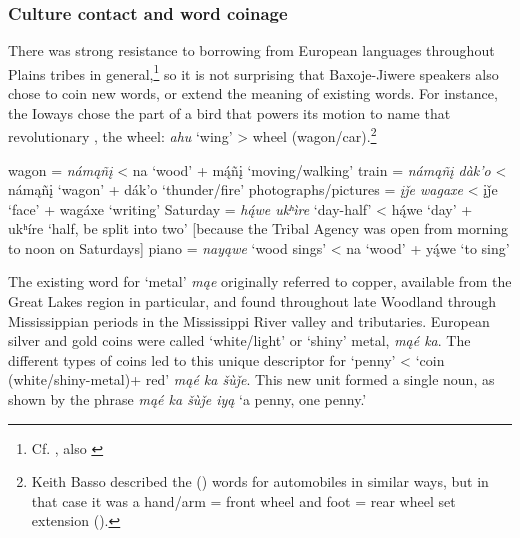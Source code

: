 \documentclass[output=paper]{LSP/langsci}
\begin{document}
\subsubsection{Culture contact and word coinage}
					   		     	     
There was strong resistance to borrowing from European languages throughout Plains tribes in general,\footnote{Cf. \citet{Brown1999}, also \citet{Larson2004}} so it is not surprising that Baxoje-Jiwere speakers also chose to coin new words, or extend the meaning of existing words. For instance, the Ioways chose the part of a bird that powers its motion to name that revolutionary , the wheel: \textit{ahu} `wing' > wheel (wagon/car).\footnote{Keith Basso described the  () words for automobiles in similar ways, but in that case it was a hand/arm = front wheel and foot = rear wheel set extension (\citeyear[17]{Basso1990}).}   

\begin{exe}
\ex
\begin{xlist}
\ex wagon = \textit{nám\k{a}ñ\k{i}} < na `wood' + m\k{á}ñ\k{i} `moving/walking'
\ex train = \textit{nám\k{a}ñ\k{i} dàk'o}  <  nám\k{a}ñ\k{i} `wagon' + dák'o `thunder/fire'		       	          	
\ex photographs/pictures = \textit{\k{i}\v{j}e wagaxe}  < \k{i}\v{j}e `face' + wagáxe `writing'	        	         	
\ex Saturday = \textit{h\k{á}we ukʰ\`ire} `day-half' < h\k{á}we `day' + ukʰ\'ire `half, be split into two' 	[because the Tribal Agency was open from morning to noon on Saturdays]        	    	
\ex piano = \textit{nay\k{a}we}  `wood sings' < na `wood' + y\k{á}we  `to sing'
\end{xlist}
\end{exe}

The existing word for `metal' \textit{m\k{a}e} originally referred to copper, available from the Great Lakes region in particular, and found throughout late Woodland through Mississippian periods in the Mississippi River valley and tributaries.  European silver and gold coins were called `white/light' or `shiny' metal, \textit{m\k{a}é ka}. The different types of coins led to this unique descriptor for `penny' < `coin (white/shiny-metal)+ red' \textit{m\k{a}é ka \v{s}\`u\v{j}e}.  This new unit formed a single  noun, as shown by the phrase \textit{m\k{a}é ka \v{s}\`u\v{j}e iy\k{a}} `a penny, one penny.'
\end{document}
